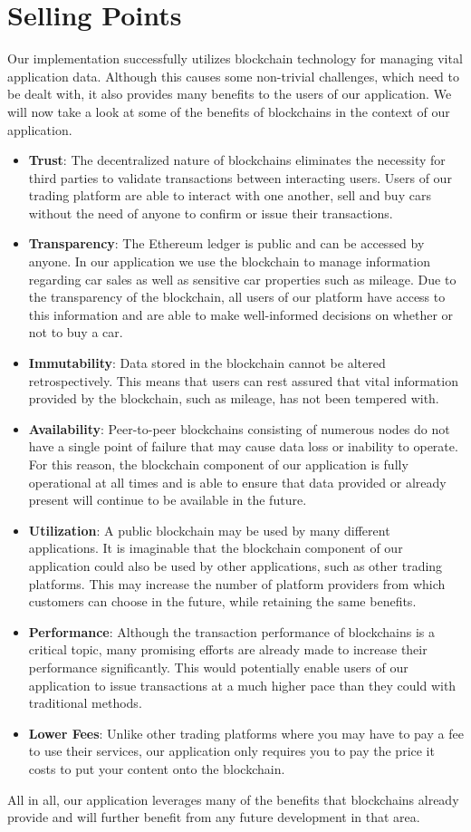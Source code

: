 \section{Selling Points}\label{sec:selling_points}

Our implementation successfully utilizes blockchain technology for managing vital application data. Although this causes some non-trivial challenges, which need to be dealt with, it also provides many benefits to the users of our application. We will now take a look at some of the benefits of blockchains in the context of our application.
\begin{itemize}
  \item \textbf{Trust}: The decentralized nature of blockchains eliminates the necessity for third parties to validate transactions between interacting users. Users of our trading platform are able to interact with one another, sell and buy cars without the need of anyone to confirm or issue their transactions.
  \item \textbf{Transparency}: The Ethereum ledger is public and can be accessed by anyone. In our application we use the blockchain to manage information regarding car sales as well as sensitive car properties such as mileage. Due to the transparency of the blockchain, all users of our platform have access to this information and are able to make well-informed decisions on whether or not to buy a car.
  \item \textbf{Immutability}: Data stored in the blockchain cannot be altered retrospectively. This means that users can rest assured that vital information provided by the blockchain, such as mileage, has not been tempered with.
  \item \textbf{Availability}: Peer-to-peer blockchains consisting of numerous nodes do not have a single point of failure that may cause data loss or inability to operate. For this reason, the blockchain component of our application is fully operational at all times and is able to ensure that data provided or already present will continue to be available in the future.
  \item \textbf{Utilization}: A public blockchain may be used by many different applications. It is imaginable that the blockchain component of our application could also be used by other applications, such as other trading platforms. This may increase the number of platform providers from which customers can choose in the future, while retaining the same benefits.
  \item \textbf{Performance}: Although the transaction performance of blockchains is a critical topic, many promising efforts are already made to increase their performance significantly. This would potentially enable users of our application to issue transactions at a much higher pace than they could with traditional methods.
  \item \textbf{Lower Fees}: Unlike other trading platforms where you may have to pay a fee to use their services, our application only requires you to pay the price it costs to put your content onto the blockchain.
\end{itemize}
All in all, our application leverages many of the benefits that blockchains already provide and will further benefit from any future development in that area.
